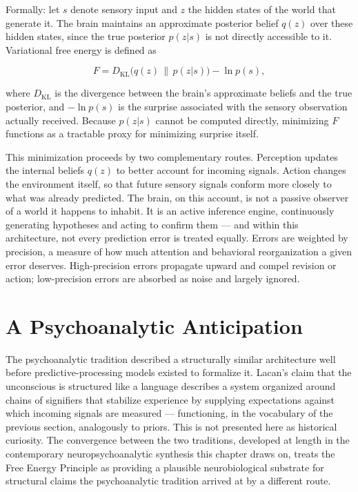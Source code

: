 \documentclass[12pt,a4paper]{book}
\begin{document}
Formally: let $s$ denote sensory input and $z$ the hidden states of the world that generate it. The brain maintains an approximate posterior belief $q(z)$ over these hidden states, since the true posterior $p(z|s)$ is not directly accessible to it. Variational free energy is defined as

\[F = D_{\mathrm{KL}}\bigl(q(z)\,\|\,p(z|s)\bigr) - \ln p(s),\]

where $D_{\mathrm{KL}}$ is the divergence between the brain's approximate beliefs and the true posterior, and $-\ln p(s)$ is the surprise associated with the sensory observation actually received. Because $p(z|s)$ cannot be computed directly, minimizing $F$ functions as a tractable proxy for minimizing surprise itself.

This minimization proceeds by two complementary routes. Perception updates the internal beliefs $q(z)$ to better account for incoming signals. Action changes the environment itself, so that future sensory signals conform more closely to what was already predicted. The brain, on this account, is not a passive observer of a world it happens to inhabit. It is an active inference engine, continuously generating hypotheses and acting to confirm them — and within this architecture, not every prediction error is treated equally. Errors are weighted by precision, a measure of how much attention and behavioral reorganization a given error deserves. High-precision errors propagate upward and compel revision or action; low-precision errors are absorbed as noise and largely ignored.

\section{A Psychoanalytic Anticipation}

The psychoanalytic tradition described a structurally similar architecture well before predictive-processing models existed to formalize it. Lacan's claim that the unconscious is structured like a language describes a system organized around chains of signifiers that stabilize experience by supplying expectations against which incoming signals are measured — functioning, in the vocabulary of the previous section, analogously to priors. This is not presented here as historical curiosity. The convergence between the two traditions, developed at length in the contemporary neuropsychoanalytic synthesis this chapter draws on, treats the Free Energy Principle as providing a plausible neurobiological substrate for structural claims the psychoanalytic tradition arrived at by a different route.
\end{document}
